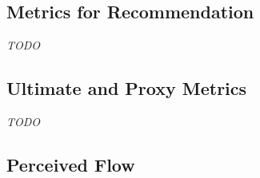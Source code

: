 \subsection{Metrics for Recommendation}

\emph{TODO}

%
%





\subsection{Ultimate and Proxy Metrics}

\emph{TODO}




\subsection{Perceived Flow}

